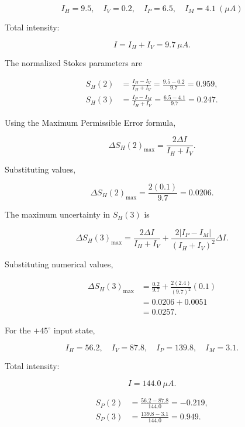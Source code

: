 \[
I_H=9.5,\quad I_V=0.2,\quad I_P=6.5,\quad I_M=4.1~(\mu A)
\]

Total intensity:

\[
I = I_H+I_V = 9.7~\mu A.
\]

The normalized Stokes parameters are

\begin{subequations}
    \begin{align}
    S_H(2) &= \frac{I_H-I_V}{I_H+I_V}
    = \frac{9.5-0.2}{9.7}
    =0.959,\\[6pt]
    S_H(3) &= \frac{I_P-I_M}{I_H+I_V}
    = \frac{6.5-4.1}{9.7}
    =0.247.
    \end{align}
\end{subequations}

Using the Maximum Permissible Error formula,

\begin{equation}
\Delta S_H(2)_{\max}
=\frac{2\Delta I}{I_H+I_V}.
\end{equation}

Substituting values,

\begin{equation}
\Delta S_H(2)_{\max}
=\frac{2(0.1)}{9.7}
=0.0206.
\end{equation}

The maximum uncertainty in $S_H(3)$ is

\begin{equation}
\Delta S_H(3)_{\max}
=
\frac{2\Delta I}{I_H+I_V}
+
\frac{2|I_P-I_M|}{(I_H+I_V)^2}\Delta I.
\end{equation}

Substituting numerical values,

\begin{equation}
    \begin{aligned}
    \Delta S_H(3)_{\max}
    &=
    \frac{0.2}{9.7}
    +
    \frac{2(2.4)}{(9.7)^2}(0.1) \\
    &=0.0206+0.0051 \\
    &=0.0257.
    \end{aligned}
\end{equation}

For the $+45^\circ$ input state,

\[
I_H=56.2,\quad I_V=87.8,\quad I_P=139.8,\quad I_M=3.1.
\]

Total intensity:

\[
I=144.0~\mu A.
\]

\begin{subequations}
    \begin{align}
    S_P(2)&=\frac{56.2-87.8}{144.0}=-0.219,\\
    S_P(3)&=\frac{139.8-3.1}{144.0}=0.949.
    \end{align}
\end{subequations}


